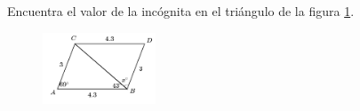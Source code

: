 \question[10]  Encuentra el valor de la incógnita en el triángulo de la figura \ref{fig:angle_triangle_26}.
\begin{figure}[H]
    \begin{center}
        \includegraphics[width=0.3\textwidth]{../images/angle_triangle_26.png}
    \end{center}
    \caption{}
    \label{fig:angle_triangle_26}
\end{figure}